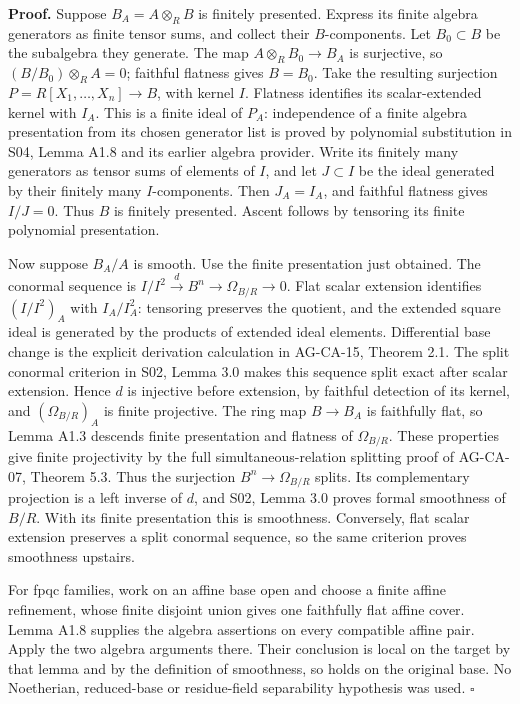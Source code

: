 \documentclass[11pt,a4paper,openany]{report}
\begin{document}
\textbf{Proof.} Suppose \(B_A=A\otimes_R B\) is finitely presented. Express its finite algebra generators as finite tensor sums, and collect their \(B\)-components. Let \(B_0\subset B\) be the subalgebra they generate. The map \(A\otimes_R B_0\to B_A\) is surjective, so \((B/B_0)\otimes_R A=0\); faithful flatness gives \(B=B_0\). Take the resulting surjection \(P=R[X_1,\ldots,X_n]\to B\), with kernel \(I\). Flatness identifies its scalar-extended kernel with \(I_A\). This is a finite ideal of \(P_A\): independence of a finite algebra presentation from its chosen generator list is proved by polynomial substitution in S04, Lemma A1.8 and its earlier algebra provider. Write its finitely many generators as tensor sums of elements of \(I\), and let \(J\subset I\) be the ideal generated by their finitely many \(I\)-components. Then \(J_A=I_A\), and faithful flatness gives \(I/J=0\). Thus \(B\) is finitely presented. Ascent follows by tensoring its finite polynomial presentation.

Now suppose \(B_A/A\) is smooth. Use the finite presentation just obtained. The conormal sequence is \(I/I^2\xrightarrow{d}B^n\to\Omega_{B/R}\to0\). Flat scalar extension identifies \((I/I^2)_A\) with \(I_A/I_A^2\): tensoring preserves the quotient, and the extended square ideal is generated by the products of extended ideal elements. Differential base change is the explicit derivation calculation in AG-CA-15, Theorem 2.1. The split conormal criterion in S02, Lemma 3.0 makes this sequence split exact after scalar extension. Hence \(d\) is injective before extension, by faithful detection of its kernel, and \((\Omega_{B/R})_A\) is finite projective. The ring map \(B\to B_A\) is faithfully flat, so Lemma A1.3 descends finite presentation and flatness of \(\Omega_{B/R}\). These properties give finite projectivity by the full simultaneous-relation splitting proof of AG-CA-07, Theorem 5.3. Thus the surjection \(B^n\to\Omega_{B/R}\) splits. Its complementary projection is a left inverse of \(d\), and S02, Lemma 3.0 proves formal smoothness of \(B/R\). With its finite presentation this is smoothness. Conversely, flat scalar extension preserves a split conormal sequence, so the same criterion proves smoothness upstairs.

For fpqc families, work on an affine base open and choose a finite affine refinement, whose finite disjoint union gives one faithfully flat affine cover. Lemma A1.8 supplies the algebra assertions on every compatible affine pair. Apply the two algebra arguments there. Their conclusion is local on the target by that lemma and by the definition of smoothness, so holds on the original base. No Noetherian, reduced-base or residue-field separability hypothesis was used. \(\square\)
\end{document}
